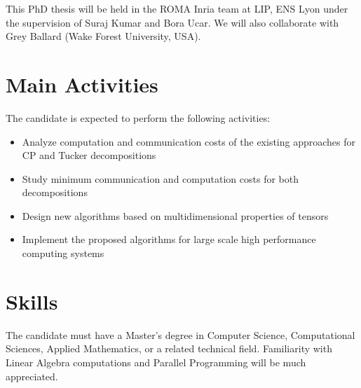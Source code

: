 \documentclass[a4paper]{article}
\begin{document}
This PhD thesis will be held in the ROMA Inria team at LIP, ENS Lyon under the supervision of Suraj Kumar and Bora Ucar. We will also collaborate with Grey Ballard (Wake Forest University, USA).

\section*{Main Activities}

The candidate is expected to perform the following activities:
\begin{itemize}
	\item Analyze computation and communication costs of the existing approaches for CP and Tucker decompositions
	\item Study minimum communication and computation costs for both decompositions
	\item Design new algorithms based on multidimensional properties of tensors
	\item Implement the proposed algorithms for large scale high performance computing systems
\end{itemize}

\section*{Skills}

The candidate must have a Master's degree  in Computer Science, Computational Sciences, Applied Mathematics, or a related technical field.\newline
Familiarity with Linear Algebra computations and Parallel Programming will be much appreciated. 





\footnotesize 
\end{document}
